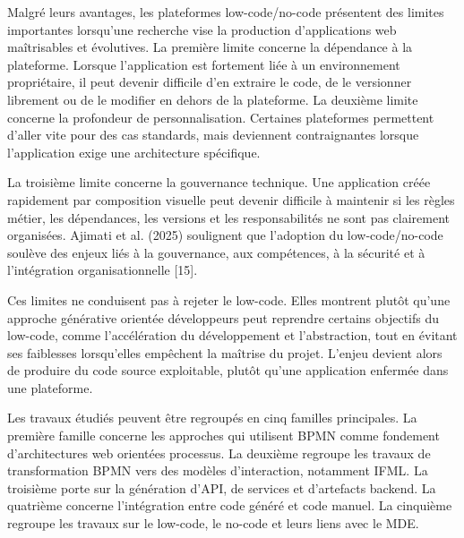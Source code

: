 Malgré leurs avantages, les plateformes low-code/no-code présentent des limites importantes lorsqu'une recherche vise la production d'applications web maîtrisables et évolutives. La première limite concerne la dépendance à la plateforme. Lorsque l'application est fortement liée à un environnement propriétaire, il peut devenir difficile d'en extraire le code, de le versionner librement ou de le modifier en dehors de la plateforme. La deuxième limite concerne la profondeur de personnalisation. Certaines plateformes permettent d'aller vite pour des cas standards, mais deviennent contraignantes lorsque l'application exige une architecture spécifique.

La troisième limite concerne la gouvernance technique. Une application créée rapidement par composition visuelle peut devenir difficile à maintenir si les règles métier, les dépendances, les versions et les responsabilités ne sont pas clairement organisées. Ajimati et al. (2025) soulignent que l'adoption du low-code/no-code soulève des enjeux liés à la gouvernance, aux compétences, à la sécurité et à l'intégration organisationnelle [15].

Ces limites ne conduisent pas à rejeter le low-code. Elles montrent plutôt qu'une approche générative orientée développeurs peut reprendre certains objectifs du low-code, comme l'accélération du développement et l'abstraction, tout en évitant ses faiblesses lorsqu'elles empêchent la maîtrise du projet. L'enjeu devient alors de produire du code source exploitable, plutôt qu'une application enfermée dans une plateforme.


Les travaux étudiés peuvent être regroupés en cinq familles principales. La première famille concerne les approches qui utilisent BPMN comme fondement d'architectures web orientées processus. La deuxième regroupe les travaux de transformation BPMN vers des modèles d'interaction, notamment IFML. La troisième porte sur la génération d'API, de services et d'artefacts backend. La quatrième concerne l'intégration entre code généré et code manuel. La cinquième regroupe les travaux sur le low-code, le no-code et leurs liens avec le MDE.

